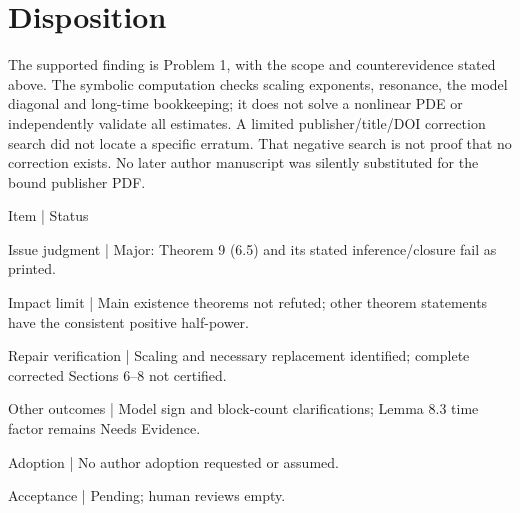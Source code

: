 \documentclass[10pt]{article}
\begin{document}
\section*{Disposition}
The supported finding is Problem 1, with the scope and counterevidence stated above. The symbolic computation checks scaling exponents, resonance, the model diagonal and long-time bookkeeping; it does not solve a nonlinear PDE or independently validate all estimates. A limited publisher/title/DOI correction search did not locate a specific erratum. That negative search is not proof that no correction exists. No later author manuscript was silently substituted for the bound publisher PDF.\par
Item | Status\par
Issue judgment | Major: Theorem 9 (6.5) and its stated inference/closure fail as printed.\par
Impact limit | Main existence theorems not refuted; other theorem statements have the consistent positive half-power.\par
Repair verification | Scaling and necessary replacement identified; complete corrected Sections 6–8 not certified.\par
Other outcomes | Model sign and block-count clarifications; Lemma 8.3 time factor remains Needs Evidence.\par
Adoption | No author adoption requested or assumed.\par
Acceptance | Pending; human reviews empty.\par
\end{document}
